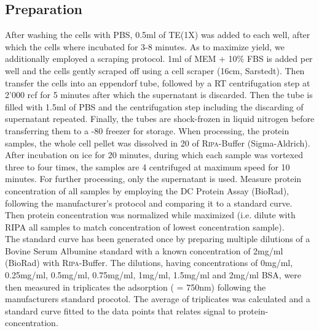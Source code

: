 \subsection{Preparation}
After washing the cells with PBS, 0.5ml of TE(1X) was added to each well, after which the cells where incubated for 3-8 minutes. As to maximize yield, we additionally employed a scraping protocol. 1ml of MEM\textalpha{} + 10\% FBS is added per well and the cells gently scraped off using a cell scraper (16cm, Sarstedt). Then transfer the cells into an eppendorf tube, followed by a RT centrifugation step at 2'000 rcf for 5 minutes after which the supernatant is discarded. Then the tube is filled with 1.5ml of PBS and the centrifugation step including the discarding of supernatant repeated. Finally, the tubes are shock-frozen in liquid nitrogen before transferring them to a -80 \degC freezer for storage. When processing, the protein samples, the whole cell pellet was dissolved in 20\mul{} of \textsc{Ripa}-Buffer (Sigma-Aldrich). After incubation on ice for 20 minutes, during which each sample was vortexed three to four times, the samples are 4 \degC centrifuged at maximum speed for 10 minutes. For further processing, only the supernatant is used. Measure protein concentration of all samples by employing the DC\texttrademark{} Protein Assay (BioRad), following the manufacturer's protocol and comparing it to a standard curve. Then protein concentration was normalized while maximized (i.e. dilute with RIPA all samples to match concentration of lowest concentration sample). \\
The standard curve has been generated once by preparing multiple dilutions of a Bovine Serum Albumine standard with a known concentration of 2mg/ml (BioRad) with \textsc{Ripa}-Buffer. The dilutions, having concentrations of 0mg/ml, 0.25mg/ml, 0.5mg/ml, 0.75mg/ml, 1mg/ml, 1.5mg/ml and 2mg/ml BSA, were then measured in triplicates the adsorption (\textlambda{} = 750nm) following the manufacturers standard procotol. The average of triplicates was calculated and a standard curve fitted to the data points that relates signal to protein-concentration. 


